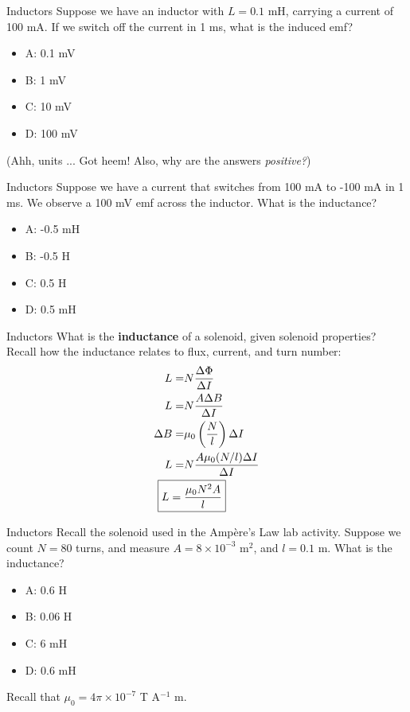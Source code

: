\documentclass{beamer}
\begin{document}
\begin{frame}{Inductors}
Suppose we have an inductor with $L = 0.1$ mH, carrying a current of 100 mA.  If we switch off the current in 1 ms, what is the induced emf?
\begin{itemize}
\item A: 0.1 mV
\item B: 1 mV
\item C: 10 mV
\item D: 100 mV
\end{itemize}
\footnotesize
(Ahh, units ... Got heem!  Also, why are the answers \textit{positive?})
\end{frame}

\begin{frame}{Inductors}
Suppose we have a current that switches from 100 mA to -100 mA in 1 ms.  We observe a 100 mV emf across the inductor.  What is the inductance?
\begin{itemize}
\item A: -0.5 mH
\item B: -0.5 H
\item C: 0.5 H 
\item D: 0.5 mH
\end{itemize}
\end{frame}

\begin{frame}{Inductors}
What is the \textbf{\alert{inductance}} of a solenoid, given solenoid properties?  Recall how the inductance relates to flux, current, and turn number:
\begin{align}
L =& N \frac{\Delta \Phi}{\Delta I} \\
L =& N \frac{A \Delta B }{\Delta I} \\
\Delta B =& \mu_0 \left(\frac{N}{l}\right) \Delta I \\
L =& N\frac{A \mu_0 (N/l) \Delta I}{\Delta I} \\
\Aboxed{L =& \frac{\mu_0 N^2 A}{l}} \label{eq:solenoid_ind}
\end{align}
\end{frame}

\begin{frame}{Inductors}
Recall the solenoid used in the Amp\`{e}re's Law lab activity.  Suppose we count $N = 80$ turns, and measure $A = 8 \times 10^{-3}$ m$^2$, and $l = 0.1$ m.  What is the inductance?
\begin{itemize}
\item A: 0.6 H
\item B: 0.06 H
\item C: 6 mH 
\item D: 0.6 mH
\end{itemize}
\footnotesize
Recall that $\mu_0 = 4\pi \times 10^{-7}$ T A$^{-1}$ m.
\end{frame}
\end{document}
